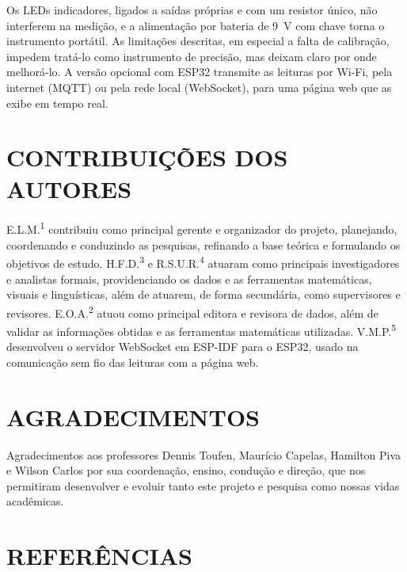 \documentclass[11pt,a4paper]{article}
\begin{document}
Os LEDs indicadores, ligados a saídas próprias e com um resistor único, não interferem na medição, e a alimentação por bateria de 9~V com chave torna o instrumento portátil. As limitações descritas, em especial a falta de calibração, impedem tratá-lo como instrumento de precisão, mas deixam claro por onde melhorá-lo. A versão opcional com ESP32 transmite as leituras por Wi-Fi, pela internet (MQTT) ou pela rede local (WebSocket), para uma página web que as exibe em tempo real.

\section*{CONTRIBUIÇÕES DOS AUTORES}

E.L.M.\textsuperscript{1} contribuiu como principal gerente e organizador do projeto, planejando, coordenando e conduzindo as pesquisas, refinando a base teórica e formulando os objetivos de estudo. H.F.D.\textsuperscript{3} e R.S.U.R.\textsuperscript{4} atuaram como principais investigadores e analistas formais, providenciando os dados e as ferramentas matemáticas, visuais e linguísticas, além de atuarem, de forma secundária, como supervisores e revisores. E.O.A.\textsuperscript{2} atuou como principal editora e revisora de dados, além de validar as informações obtidas e as ferramentas matemáticas utilizadas. V.M.P.\textsuperscript{5} desenvolveu o servidor WebSocket em ESP-IDF para o ESP32, usado na comunicação sem fio das leituras com a página web.

\section*{AGRADECIMENTOS}

Agradecimentos aos professores Dennis Toufen, Maurício Capelas, Hamilton Piva e Wilson Carlos por sua coordenação, ensino, condução e direção, que nos permitiram desenvolver e evoluir tanto este projeto e pesquisa como nossas vidas acadêmicas.

\section*{REFERÊNCIAS}
\end{document}

